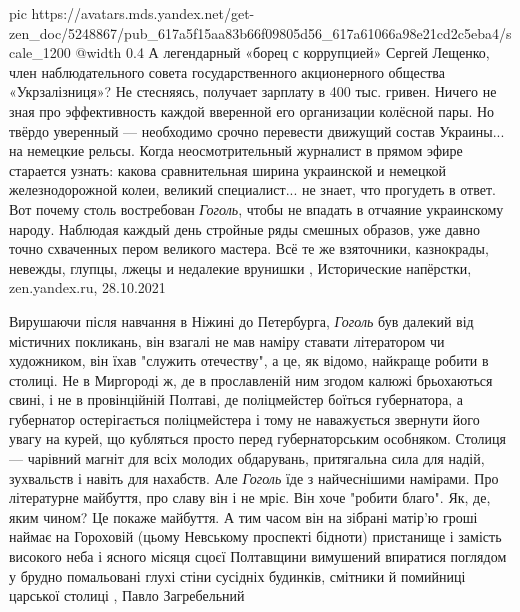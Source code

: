  
 
 
 
 

\ifcmt
  pic https://avatars.mds.yandex.net/get-zen_doc/5248867/pub_617a5f15aa83b66f09805d56_617a61066a98e21cd2c5eba4/scale_1200
  @width 0.4
\fi
А легендарный «борец с коррупцией» Сергей Лещенко, член наблюдательного совета
государственного акционерного общества «Укрзалізниця»? Не стесняясь, получает
зарплату в 400 тыс. гривен. Ничего не зная про эффективность каждой вверенной
его организации колёсной пары.  Но твёрдо уверенный — необходимо срочно
перевести движущий состав Украины... на немецкие рельсы. Когда неосмотрительный
журналист в прямом эфире старается узнать: какова сравнительная ширина
украинской и немецкой железнодорожной колеи, великий специалист... не знает,
что прогудеть в ответ.  Вот почему столь востребован \emph{Гоголь}, чтобы не
впадать в отчаяние украинскому народу.  Наблюдая каждый день стройные ряды
смешных образов, уже давно точно схваченных пером великого мастера. Всё те же
взяточники, казнокрады, невежды, глупцы, лжецы и недалекие врунишки
, 
Исторические напёрстки, zen.yandex.ru, 28.10.2021

Вирушаючи після навчання в Ніжині до Петербурга, \emph{Гоголь} був далекий від
містичних покликань, він взагалі не мав наміру ставати літератором чи
художником, він їхав "служить отечеству", а це, як відомо, найкраще робити в
столиці. Не в Миргороді ж, де в прославленій ним згодом калюжі брьохаються
свині, і не в провінційній Полтаві, де поліцмейстер боїться губернатора, а
губернатор остерігається поліцмейстера і тому не наважується звернути його
увагу на курей, що кубляться просто перед губернаторським особняком. Столиця —
чарівний магніт для всіх молодих обдарувань, притягальна сила для надій,
зухвальств і навіть для нахабств.  Але \emph{Гоголь} їде з найчеснішими
намірами. Про літературне майбуття, про славу він і не мріє. Він хоче "робити
благо". Як, де, яким чином? Це покаже майбуття. А тим часом він на зібрані
матір'ю гроші наймає на Гороховій (цьому Невському проспекті бідноти)
пристанище і замість високого неба і ясного місяця сцоєї Полтавщини вимушений
впиратися поглядом у брудно помальовані глухі стіни сусідніх будинків, смітники
й помийниці царської столиці
, Павло Загребельний
